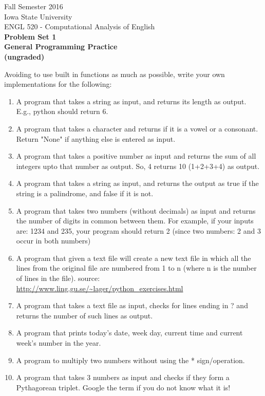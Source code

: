 \documentclass[11pt,a4paper]{article}
\begin{document}
\begin{center}
  Fall Semester 2016 \\ Iowa State University\\[3ex]
  {\large ENGL 520 - Computational Analysis of English}\\[3ex]
  \textbf{Problem Set 1} \\ \textbf{General Programming Practice \\ (ungraded)}
\end{center}

Avoiding to use built in functions as much as possible, write your own implementations for the following:
\begin{enumerate}
\item A program that takes a string as input, and returns its length as output. E.g., python should return 6.
\item A program that takes a character and returns if it is a vowel or a consonant. Return "None" if anything else is entered as input.
\item A program that takes a positive number as input and returns the sum of all integers upto that number as output. So, 4 returns 10 (1+2+3+4) as output.
\item A program that takes a string as input, and returns the output as true if the string is a palindrome, and false if it is not.
\item A program that takes two numbers (without decimals) as input and returns the number of digits in common between them. For example, if your inputs are: 1234 and 235, your program should return 2 (since two numbers: 2 and 3 occur in both numbers)
\item A program that given a text file will create a new text file in which all the lines from the original file are numbered from 1 to n (where n is the number of lines in the file). source: \url{http://www.ling.gu.se/~lager/python_exercises.html} 
\item A program that takes a text file as input, checks for lines ending in ? and returns the number of such lines as output.
\item A program that prints today's date, week day, current time and current week's number in the year.
\item A program to multiply two numbers without using the * sign/operation.
\item A program that takes 3 numbers as input and checks if they form a Pythagorean triplet. Google the term if you do not know what it is!
\end{enumerate}
\end{document}
